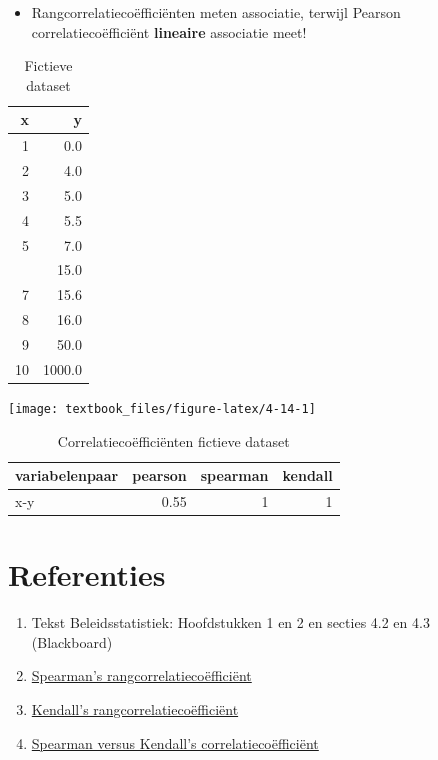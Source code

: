 \documentclass[]{tufte-book}
\providecommand{\tightlist}{%
  \setlength{\itemsep}{0pt}\setlength{\parskip}{0pt}}
\begin{document}
\begin{itemize}
\tightlist
\item
  Rangcorrelatiecoëfficiënten meten associatie, terwijl Pearson correlatiecoëfficiënt \textbf{lineaire} associatie meet!
\end{itemize}

\begin{table}

\caption{\label{tab:4-13}Fictieve dataset}
\centering
\fontsize{10}{12}\selectfont
\begin{tabular}[t]{rr}
\toprule
x & y\\
\midrule
1 & 0.0\\
2 & 4.0\\
3 & 5.0\\
4 & 5.5\\
5 & 7.0\\
\addlinespace
6 & 15.0\\
7 & 15.6\\
8 & 16.0\\
9 & 50.0\\
10 & 1000.0\\
\bottomrule
\end{tabular}
\end{table}

\texttt{[image: textbook\_files/figure-latex/4-14-1]}

\begin{table}

\caption{\label{tab:4-15}Correlatiecoëfficiënten fictieve dataset}
\centering
\fontsize{10}{12}\selectfont
\begin{tabular}[t]{lrrr}
\toprule
variabelenpaar & pearson & spearman & kendall\\
\midrule
x-y & 0.55 & 1 & 1\\
\bottomrule
\end{tabular}
\end{table}

\hypertarget{referenties-2}{%
\section*{Referenties}\label{referenties-2}}

\begin{enumerate}
\def\labelenumi{\arabic{enumi}.}
\tightlist
\item
  Tekst Beleidsstatistiek: Hoofdstukken 1 en 2 en secties 4.2 en 4.3 (Blackboard)
\item
  \href{https://nl.wikipedia.org/wiki/Spearmans_rangcorrelatieco\%C3\%ABffici\%C3\%ABnt}{Spearman's rangcorrelatiecoëfficiënt}
\item
  \href{https://nl.wikipedia.org/wiki/Kendalls_tau}{Kendall's rangcorrelatiecoëfficiënt}
\item
  \href{https://www.researchgate.net/post/Does_Spearmans_rho_have_any_advantage_over_Kendalls_tau}{Spearman versus Kendall's correlatiecoëfficiënt}
\end{enumerate}
\end{document}
